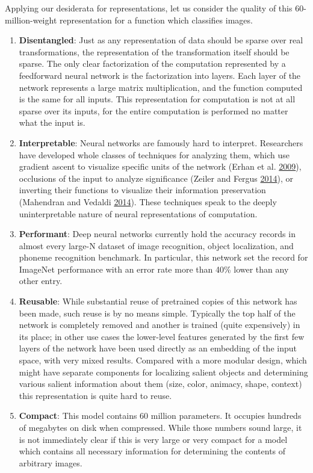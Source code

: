\documentclass[12pt,twoside]{mitthesis}
\begin{document}
Applying our desiderata for representations, let us consider the quality
of this 60-million-weight representation for a function which classifies
images.

\begin{enumerate}
\def\labelenumi{\arabic{enumi}.}
\item
  \textbf{Disentangled}: Just as any representation of data should be
  sparse over real transformations, the representation of the
  transformation itself should be sparse. The only clear factorization
  of the computation represented by a feedforward neural network is the
  factorization into layers. Each layer of the network represents a
  large matrix multiplication, and the function computed is the same for
  all inputs. This representation for computation is not at all sparse
  over its inputs, for the entire computation is performed no matter
  what the input is.
\item
  \textbf{Interpretable}: Neural networks are famously hard to
  interpret. Researchers have developed whole classes of techniques for
  analyzing them, which use gradient ascent to visualize specific units
  of the network (Erhan et al.
  \protect\hyperlink{ref-erhan2009visualizing}{2009}), occlusions of the
  input to analyze significance (Zeiler and Fergus
  \protect\hyperlink{ref-zeiler2014visualizing}{2014}), or inverting
  their functions to visualize their information preservation (Mahendran
  and Vedaldi \protect\hyperlink{ref-mahendran2014understanding}{2014}).
  These techniques speak to the deeply uninterpretable nature of neural
  representations of computation.
\item
  \textbf{Performant}: Deep neural networks currently hold the accuracy
  records in almost every large-N dataset of image recognition, object
  localization, and phoneme recognition benchmark. In particular, this
  network set the record for ImageNet performance with an error rate
  more than 40\% lower than any other entry.
\item
  \textbf{Reusable}: While substantial reuse of pretrained copies of
  this network has been made, such reuse is by no means simple.
  Typically the top half of the network is completely removed and
  another is trained (quite expensively) in its place; in other use
  cases the lower-level features generated by the first few layers of
  the network have been used directly as an embedding of the input
  space, with very mixed results. Compared with a more modular design,
  which might have separate components for localizing salient objects
  and determining various salient information about them (size, color,
  animacy, shape, context) this representation is quite hard to reuse.
\item
  \textbf{Compact}: This model contains 60 million parameters. It
  occupies hundreds of megabytes on disk when compressed. While those
  numbers sound large, it is not immediately clear if this is very large
  or very compact for a model which contains all necessary information
  for determining the contents of arbitrary images.
\end{enumerate}
\end{document}

